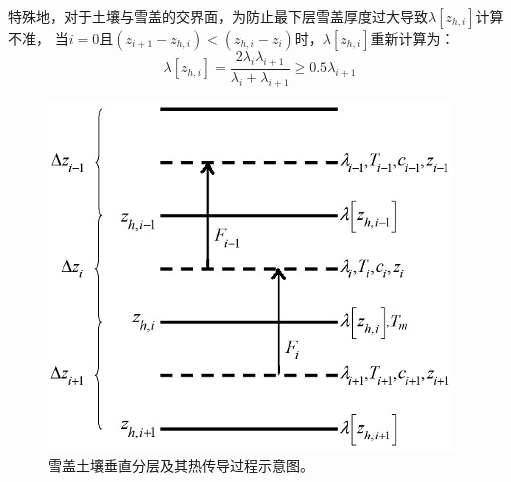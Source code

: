 特殊地，对于土壤与雪盖的交界面，为防止最下层雪盖厚度过大导致$\lambda\left[z_{h,i}\right]$计算不准，
当$i=0$且$\left(z_{i+1}-z_{h,i}\right)<\left(z_{h,i}-z_i\right)$时，$\lambda\left[z_{h,i}\right]$重新计算为：
\begin{equation}
\lambda\left[z_{h,i}\right]=\frac{2 \lambda_{i} \lambda_{i+1}}{\lambda_{i}+\lambda_{i+1}} \geq 0.5 \lambda_{i+1}
\end{equation}
{
\begin{figure}[]
\centering
\includegraphics{Figures/雪盖土壤热力过程/雪盖土壤垂直分层及其热传导过程示意图.png}
\caption{雪盖土壤垂直分层及其热传导过程示意图。}
\label{fig:雪盖土壤垂直分层及其热传导过程示意图}
\end{figure}
}


